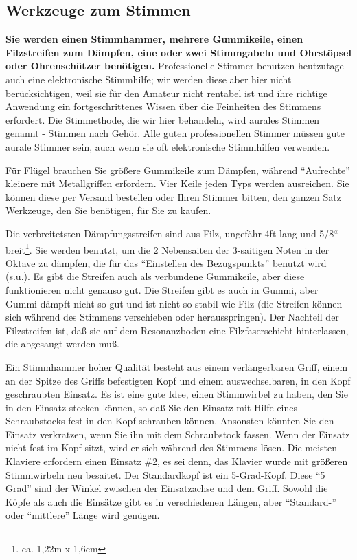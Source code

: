 
\subsection{Werkzeuge zum Stimmen}
\label{c2_3}

\textbf{Sie werden einen Stimmhammer, mehrere Gummikeile, einen Filzstreifen zum Dämpfen, eine oder zwei Stimmgabeln und Ohrstöpsel oder Ohrenschützer benötigen.}
Professionelle Stimmer benutzen heutzutage auch eine elektronische Stimmhilfe; wir werden diese aber hier nicht berücksichtigen, weil sie für den Amateur nicht rentabel ist und ihre richtige Anwendung ein fortgeschrittenes Wissen über die Feinheiten des Stimmens erfordert.
Die Stimmethode, die wir hier behandeln, wird aurales Stimmen genannt - Stimmen nach Gehör.
Alle guten professionellen Stimmer müssen gute aurale Stimmer sein, auch wenn sie oft elektronische Stimmhilfen verwenden.

Für Flügel brauchen Sie größere Gummikeile zum Dämpfen, während \enquote{\hyperref[upright]{Aufrechte}} kleinere mit Metallgriffen erfordern.
Vier Keile jeden Typs werden ausreichen.
Sie können diese per Versand bestellen oder Ihren Stimmer bitten, den ganzen Satz Werkzeuge, den Sie benötigen, für Sie zu kaufen.

Die verbreitetsten Dämpfungsstreifen sind aus Filz, ungefähr 4ft lang und 5/8`` breit\footnote{ca. 1,22m x 1,6cm}.
Sie werden benutzt, um die 2 Nebensaiten der 3-saitigen Noten in der Oktave zu dämpfen, die für das \enquote{\hyperref[c2_4]{Einstellen des Bezugspunkts}} benutzt wird (s.u.).
Es gibt die Streifen auch als verbundene Gummikeile, aber diese funktionieren nicht genauso gut.
Die Streifen gibt es auch in Gummi, aber Gummi dämpft nicht so gut und ist nicht so stabil wie Filz (die Streifen können sich während des Stimmens verschieben oder herausspringen).
Der Nachteil der Filzstreifen ist, daß sie auf dem Resonanzboden eine Filzfaserschicht hinterlassen, die abgesaugt werden muß.

Ein Stimmhammer hoher Qualität besteht aus einem verlängerbaren Griff, einem an der Spitze des Griffs befestigten Kopf und einem auswechselbaren, in den Kopf geschraubten Einsatz.
Es ist eine gute Idee, einen Stimmwirbel zu haben, den Sie in den Einsatz stecken können, so daß Sie den Einsatz mit Hilfe eines Schraubstocks fest in den Kopf schrauben können.
Ansonsten könnten Sie den Einsatz verkratzen, wenn Sie ihn mit dem Schraubstock fassen.
Wenn der Einsatz nicht fest im Kopf sitzt, wird er sich während des Stimmens lösen.
Die meisten Klaviere erfordern einen Einsatz \#2, es sei denn, das Klavier wurde mit größeren Stimmwirbeln neu besaitet.
Der Standardkopf ist ein 5-Grad-Kopf.
Diese \enquote{5 Grad} sind der Winkel zwischen der Einsatzachse und dem Griff.
Sowohl die Köpfe als auch die Einsätze gibt es in verschiedenen Längen, aber \enquote{Standard-} oder \enquote{mittlere} Länge wird genügen.
 

